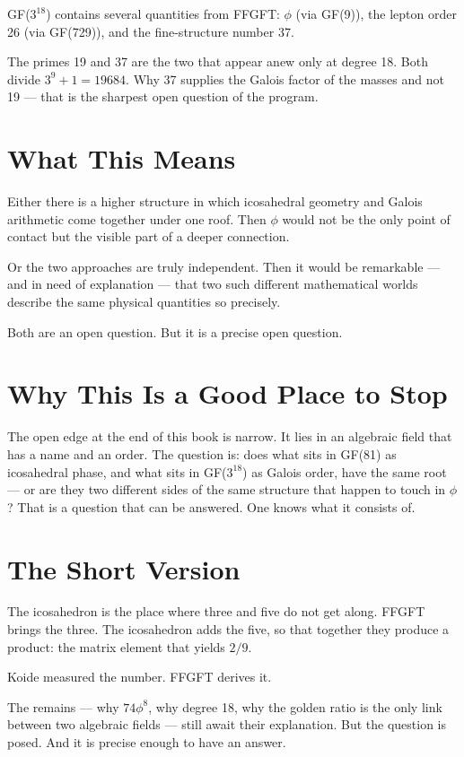 \documentclass[12pt,oneside]{book}
\begin{document}
GF($3^{18}$) contains several quantities from FFGFT: $\phi$ (via GF(9)), the lepton order 26 (via GF(729)), and the fine-structure number 37.

The primes 19 and 37 are the two that appear anew only at degree 18. Both divide $3^9 + 1 = 19684$. Why 37 supplies the Galois factor of the masses and not 19 --- that is the sharpest open question of the program.

\section{What This Means}

Either there is a higher structure in which icosahedral geometry and Galois arithmetic come together under one roof. Then $\phi$ would not be the only point of contact but the visible part of a deeper connection.

Or the two approaches are truly independent. Then it would be remarkable --- and in need of explanation --- that two such different mathematical worlds describe the same physical quantities so precisely.

Both are an open question. But it is a precise open question.

\section{Why This Is a Good Place to Stop}

The open edge at the end of this book is narrow. It lies in an algebraic field that has a name and an order. The question is: does what sits in GF(81) as icosahedral phase, and what sits in GF($3^{18}$) as Galois order, have the same root --- or are they two different sides of the same structure that happen to touch in $\phi$? That is a question that can be answered. One knows what it consists of.

\section{The Short Version}

The icosa\-hedron is the place where three and five do not get along. FFGFT brings the three. The icosa\-hedron adds the five, so that together they produce a product: the matrix element that yields $2/9$.

Koide measured the number. FFGFT derives it.

The remains --- why $74\phi^8$, why degree 18, why the golden ratio is the only link between two algebraic fields --- still await their explanation. But the question is posed. And it is precise enough to have an answer.
\end{document}
